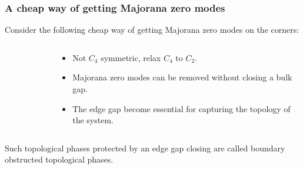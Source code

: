 \documentclass{beamer}
\renewcommand{\(}{\left(}
\renewcommand{\)}{\right)}
\renewcommand{\[}{\left[}
\renewcommand{\]}{\right]}
\begin{document}
\begin{frame}
    \frametitle{A cheap way of getting Majorana zero modes}
    Consider the following cheap way of getting Majorana zero modes on the corners: 
    \begin{columns}
        \begin{column}{0.4\textwidth}
            \begin{figure}[]
                \centering
            \end{figure}
        \end{column}\pause
        \begin{column}{0.6\textwidth}
            \begin{itemize}
                \item Not $C_4$ symmetric, relax $C_4$ to $C_2$.\pause
                \item Majorana zero modes can be removed without closing a bulk gap. \pause
                \item The edge gap become essential for capturing the topology of the system. 
            \end{itemize}
        \end{column}
    \end{columns}\pause
    \begin{framed}
        Such topological phases protected by an edge gap closing are called boundary obstructed topological phases.
    \end{framed}
\end{frame}
\end{document}
